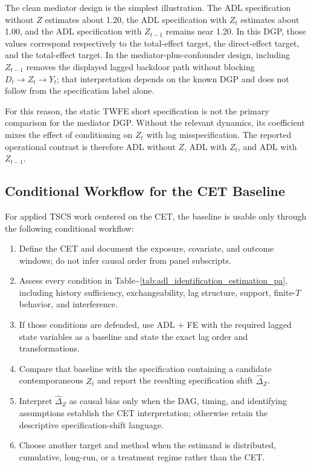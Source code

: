 \documentclass[
]{article}
\providecommand{\tightlist}{%
  \setlength{\itemsep}{0pt}\setlength{\parskip}{0pt}}
\begin{document}
The clean mediator design is the simplest illustration. The ADL
specification without \(Z\) estimates about 1.20, the ADL specification
with \(Z_t\) estimates about 1.00, and the ADL specification with
\(Z_{t-1}\) remains near 1.20. In this DGP, those values correspond
respectively to the total-effect target, the direct-effect target, and
the total-effect target. In the mediator-plus-confounder design,
including \(Z_{t-1}\) removes the displayed lagged backdoor path without
blocking \(D_t \rightarrow Z_t \rightarrow Y_t\); that interpretation
depends on the known DGP and does not follow from the specification
label alone.

For this reason, the static TWFE short specification is not the primary
comparison for the mediator DGP. Without the relevant dynamics, its
coefficient mixes the effect of conditioning on \(Z_t\) with lag
misspecification. The reported operational contrast is therefore ADL
without \(Z\), ADL with \(Z_t\), and ADL with \(Z_{t-1}\).

\subsection{Conditional Workflow for the CET
Baseline}\label{conditional-workflow-for-the-cet-baseline}

For applied TSCS work centered on the CET, the baseline is usable only
through the following conditional workflow:

\begin{enumerate}
\def\labelenumi{\arabic{enumi}.}
\tightlist
\item
  Define the CET and document the exposure, covariate, and outcome
  windows; do not infer causal order from panel subscripts.
\item
  Assess every condition in
  Table\textasciitilde{}\ref{tab:adl_identification_estimation_pa},
  including history sufficiency, exchangeability, lag structure,
  support, finite-\(T\) behavior, and interference.
\item
  If those conditions are defended, use ADL + FE with the required
  lagged state variables as a baseline and state the exact lag order and
  transformations.
\item
  Compare that baseline with the specification containing a candidate
  contemporaneous \(Z_t\) and report the resulting specification shift
  \(\widehat{\Delta}_Z\).
\item
  Interpret \(\widehat{\Delta}_Z\) as causal bias only when the DAG,
  timing, and identifying assumptions establish the CET interpretation;
  otherwise retain the descriptive specification-shift language.
\item
  Choose another target and method when the estimand is distributed,
  cumulative, long-run, or a treatment regime rather than the CET.
\end{enumerate}
\end{document}
